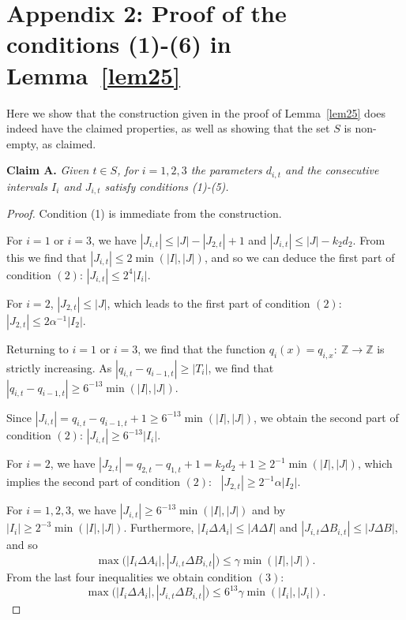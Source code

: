 \documentclass[12pt,reqno]{amsart}
\theoremstyle{definition}
\renewcommand\leq{\leqslant}
\renewcommand\geq{\geqslant}
\renewcommand\ge{\geqslant}
\begin{document}
\section{Appendix 2: Proof of the conditions (1)-(6) in Lemma~\ref{lem25}}


Here we show that the construction given in the proof of Lemma~\ref{lem25} does indeed have the
claimed properties, as well as showing that the set $S$ is non-empty, as claimed. 


\vspace{7pt}
{\bf Claim A. }{\em  Given $t\in S$, for $i=1,2,3$ the parameters $d_{i,t}$ and the consecutive intervals $I_{i}$ and $J_{i,t}$ satisfy conditions (1)-(5).
}
\begin{proof}

\vspace{7pt}
\noindent
Condition (1) is immediate from the construction.

For $i=1$ or $i=3$, we have $|J_{i,t}|\leq |J|-|J_{2,t}|+1$ and $|J_{i,t}|\leq |J|-k_2d_2$. From this we find that
$|J_{i,t}|\leq 2\min(|I|,|J|)$,
and so we can deduce the first part of condition $(2)$: $|J_{i,t}|\leq 2^4|I_i|$.

\vspace{7pt}
\noindent
For $i=2$, $|J_{2,t}|\leq |J|$,
which leads to the first part of condition $(2)$: $|J_{2,t}|\leq 2\alpha^{-1}|I_2|$.

\vspace{7pt}
\noindent
Returning to  $i=1$ or $i=3$,  we find that the function $q_i(x)=q_{i,x}: \  \mathbb{Z} \rightarrow \mathbb{Z}$ is strictly increasing. As $|q_{i,t}-q_{{i-1},t}| \geq |T_i|$, we find that $|q_{i,t}-q_{{i-1},t}| \geq 6^{-13}\min(|I|,|J|)$.

\vspace{7pt}
\noindent
Since $|J_{i,t}|=q_{i, t}-q_{i-1, t}+1 \geq 6^{-13}\min(|I|,|J|)$,
we obtain the second part of condition $(2)$:
$|J_{i,t}|\geq 6^{-13}|I_i|$.


\vspace{7pt}
\noindent
For $i=2$,  we have $|J_{2,t}|=q_{2,t}-q_{1,t}+1=k_2d_2+1 \ge  2^{-1}\min(|I|,|J|)$, which implies
the second part of condition $(2)$: \ $|J_{2,t}|\geq 2^{-1}\alpha |I_2|$.


\vspace{7pt}
\noindent
For $i=1,2,3$,  we have $|J_{i,t}|\geq 6^{-13}\min(|I|,|J|)$ and by $|I_{i}|\geq 2^{-3}\min(|I|,|J|)$.
Furthermore,
$|I_{i}\Delta A_i| \leq |A\Delta I|$ and  $|J_{i,t}\Delta B_{i,t}|\leq |J\Delta B|$,
and so
\[
\max\bigg(|I_{i}\Delta A_i| , |J_{i,t}\Delta B_{i,t}|\bigg)\leq \gamma \min(|I|,|J|).
\]
From the last four inequalities we obtain condition $(3)$:
\[
\max\bigg(|I_{i}\Delta A_i| , |J_{i,t}\Delta B_{i,t}|\bigg)\leq 6^{13}\gamma \min(|I_i|,|J_i|).
\]


\end{proof}
\end{document}
